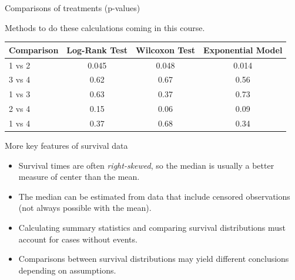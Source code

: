 \documentclass[ignorenonframetext,]{beamer}
\begin{document}
\begin{frame}{%
\protect\hypertarget{comparisons-of-treatments-p-values}{%
Comparisons of treatments (p-values)}}

Methods to do these calculations coming in this course.

\begin{tabular}{lccc}
\hline
Comparison & Log-Rank Test & Wilcoxon Test & Exponential Model \\ \hline
1 vs 2     & 0.045 & 0.048 & 0.014 \\
3 vs 4     & 0.62 & 0.67 & 0.56 \\
1 vs 3     & 0.63 & 0.37 & 0.73 \\
2 vs 4     & 0.15 & 0.06 & 0.09 \\
1 vs 4     & 0.37 & 0.68 & 0.34 \\
\hline
\end{tabular}

\end{frame}

\begin{frame}{%
\protect\hypertarget{more-key-features-of-survival-data}{%
More key features of survival data}}

\begin{itemize}
\item
  Survival times are often \emph{right-skewed}, so the median is usually
  a better measure of center than the mean.
\item
  The median can be estimated from data that include censored
  observations (not always possible with the mean).
\item
  Calculating summary statistics and comparing survival distributions
  must account for cases without events.
\item
  Comparisons between survival distributions may yield different
  conclusions depending on assumptions.
\end{itemize}

\end{frame}
\end{document}
